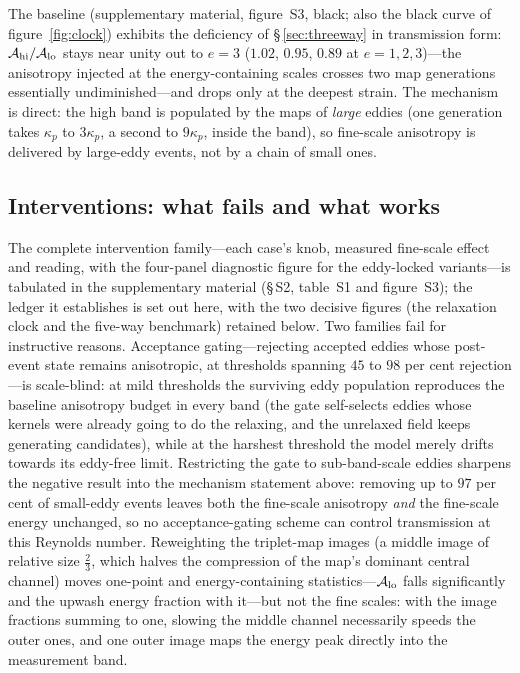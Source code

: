 \documentclass[lineno]{JFM-FLM_Au}
\begin{document}
The baseline (supplementary material, figure~S3, black; also the black
curve of figure~\ref{fig:clock}) exhibits the deficiency of
\S\,\ref{sec:threeway} in transmission form:
$\mathcal A_{\rm hi}/\mathcal A_{\rm lo}$ stays near unity out to $e=3$
($1.02$, $0.95$, $0.89$ at $e=1,2,3$)---the anisotropy injected at the
energy-containing scales crosses two map generations essentially
undiminished---and drops only at the deepest strain. The mechanism is
direct: the high band is populated by the maps of \emph{large} eddies
(one generation takes $\kappa_p$ to $3\kappa_p$, a second to $9\kappa_p$,
inside the band), so fine-scale anisotropy is delivered by large-eddy
events, not by a chain of small ones.

\subsection{Interventions: what fails and what works}\label{sec:interventions}

The complete intervention family---each case's knob, measured
fine-scale effect and reading, with the four-panel diagnostic figure
for the eddy-locked variants---is tabulated in the supplementary
material (\S\,S2, table~S1 and figure~S3); the ledger it establishes
is set out here, with the two decisive figures (the relaxation clock
and the five-way benchmark) retained below. Two
families fail for instructive reasons. Acceptance gating---rejecting
accepted eddies whose post-event state remains anisotropic, at thresholds
spanning $45$ to $98$ per cent rejection---is scale-blind: at mild
thresholds the surviving eddy population reproduces the baseline
anisotropy budget in every band (the gate self-selects eddies whose
kernels were already going to do the relaxing, and the unrelaxed field
keeps generating candidates), while at the harshest threshold the model
merely drifts towards its eddy-free limit. Restricting the gate to
sub-band-scale eddies sharpens the negative result into the mechanism
statement above: removing up to $97$ per cent of small-eddy events leaves
both the fine-scale anisotropy \emph{and} the fine-scale energy
unchanged, so no acceptance-gating scheme can control transmission at
this Reynolds number. Reweighting the triplet-map images (a middle image
of relative size $\tfrac23$, which halves the compression of the
map's dominant central channel) moves one-point and energy-containing
statistics---$\mathcal A_{\rm lo}$ falls significantly and the upwash
energy fraction with it---but not the fine scales: with the image
fractions summing to one, slowing the middle channel necessarily speeds
the outer ones, and one outer image maps the energy peak directly into
the measurement band.
\end{document}
